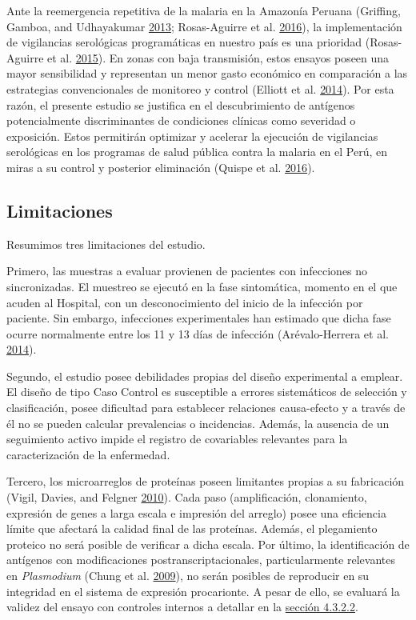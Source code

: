 \documentclass[
  a4paper]{article}
\begin{document}
Ante la reemergencia repetitiva de la malaria en la Amazonía Peruana
(Griffing, Gamboa, and Udhayakumar
\protect\hyperlink{ref-griffing2013history}{2013}; Rosas-Aguirre et al.
\protect\hyperlink{ref-rosas2016peru}{2016}), la implementación de
vigilancias serológicas programáticas en nuestro país es una prioridad
(Rosas-Aguirre et al. \protect\hyperlink{ref-hotspots2015}{2015}). En
zonas con baja transmisión, estos ensayos poseen una mayor sensibilidad
y representan un menor gasto económico en comparación a las estrategias
convencionales de monitoreo y control (Elliott et al.
\protect\hyperlink{ref-elliott2014}{2014}). Por esta razón, el presente
estudio se justifica en el descubrimiento de antígenos potencialmente
discriminantes de condiciones clínicas como severidad o exposición.
Estos permitirán optimizar y acelerar la ejecución de vigilancias
serológicas en los programas de salud pública contra la malaria en el
Perú, en miras a su control y posterior eliminación (Quispe et al.
\protect\hyperlink{ref-accelerate2016}{2016}).

\hypertarget{limit}{%
\subsection{Limitaciones}\label{limit}}

Resumimos tres limitaciones del estudio.

Primero, las muestras a evaluar provienen de pacientes con infecciones
no sincronizadas. El muestreo se ejecutó en la fase sintomática, momento
en el que acuden al Hospital, con un desconocimiento del inicio de la
infección por paciente. Sin embargo, infecciones experimentales han
estimado que dicha fase ocurre normalmente entre los 11 y 13 días de
infección (Arévalo-Herrera et al.
\protect\hyperlink{ref-arevalo2014}{2014}).

Segundo, el estudio posee debilidades propias del diseño experimental a
emplear. El diseño de tipo Caso Control es susceptible a errores
sistemáticos de selección y clasificación, posee dificultad para
establecer relaciones causa-efecto y a través de él no se pueden
calcular prevalencias o incidencias. Además, la ausencia de un
seguimiento activo impide el registro de covariables relevantes para la
caracterización de la enfermedad.

Tercero, los microarreglos de proteínas poseen limitantes propias a su
fabricación (Vigil, Davies, and Felgner
\protect\hyperlink{ref-vigil2010}{2010}). Cada paso (amplificación,
clonamiento, expresión de genes a larga escala e impresión del arreglo)
posee una eficiencia límite que afectará la calidad final de las
proteínas. Además, el plegamiento proteico no será posible de verificar
a dicha escala. Por último, la identificación de antígenos con
modificaciones postranscriptacionales, particularmente relevantes en
\emph{Plasmodium} (Chung et al.
\protect\hyperlink{ref-leroch2009postmod}{2009}), no serán posibles de
reproducir en su integridad en el sistema de expresión procarionte. A
pesar de ello, se evaluará la validez del ensayo con controles internos
a detallar en la \protect\hyperlink{validez}{sección 4.3.2.2}.
\end{document}

